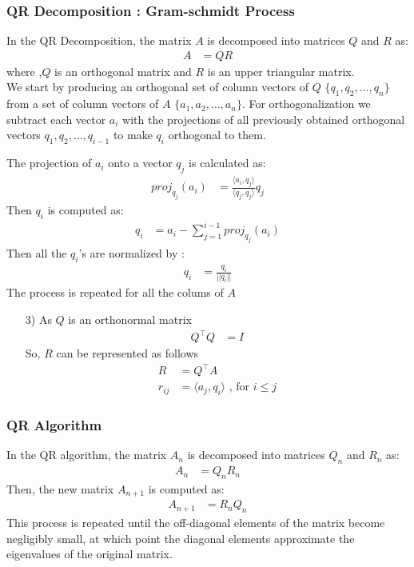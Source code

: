 \documentclass{beamer}
\theoremstyle{remark}
\begin{document}
\begin{frame}
    \frametitle{QR Decomposition : Gram-schmidt Process}
     In the QR Decomposition, the matrix $A$ is decomposed into matrices $Q$ and $R$ as:
    \begin{align}
    A&=QR
    \end{align}
    where ,$Q$ is an orthogonal matrix and $R$ is an upper triangular matrix.\\
     We start by producing an orthogonal set of column vectors of $Q$ \( \{ q_1, q_2, \dots, q_n \} \) from a set of column vectors of $A$ \( \{ a_1, a_2, \dots, a_n \} \).
     For orthogonalization we subtract each vector $a_i$ with the projections of all previously obtained orthogonal vectors $q_1,q_2,\dots,q_{i-1}$ to make $q_i$ orthogonal to them. \\
 \end{frame}
 \begin{frame}
    The projection of $a_i$ onto a vector $q_j$ is calculated as:
    \begin{align}
    proj_{q_j}(a_i) &= \frac{\langle a_i,q_j\rangle}{\langle q_j,q_j\rangle}q_j
    \end{align}
    Then $q_i$ is computed as:
    \begin{align}
    q_i &= a_i- \sum_{j=1}^{i-1}proj_{q_j}(a_i)
    \end{align}
    Then all the $q_i$'s are normalized by :
    \begin{align}
    q_i &= \frac{q_i}{||q_i||}
    \end{align}
    The process is repeated for all the colums of $A$
    \begin{enumerate}
    \item[3)] As $Q$ is an orthonormal matrix
    \begin{align}
        Q^\top Q &=I
    \end{align}
    So, $R$ can be represented as follows
    \begin{align}
        R &= Q^\top A\\
        r_{ij} &= \langle a_j, q_i \rangle \text{ , for  }  i \leq j 
    \end{align}
\end{enumerate}
\end{frame}

\begin{frame}
    \frametitle{QR Algorithm}
   In the  QR algorithm, the matrix $A_n$ is decomposed into matrices $Q_n$ and $R_n$ as:
    \begin{align}
    A_{n}&=Q_nR_n
    \end{align}
Then, the new matrix $A_{n+1}$ is computed as:
\begin{align}
A_{n+1}&=R_nQ_n
\end{align}
This process is repeated until the off-diagonal elements of the matrix become negligibly small, at which point the diagonal elements approximate the eigenvalues of the original matrix.
\end{frame}
\end{document}
